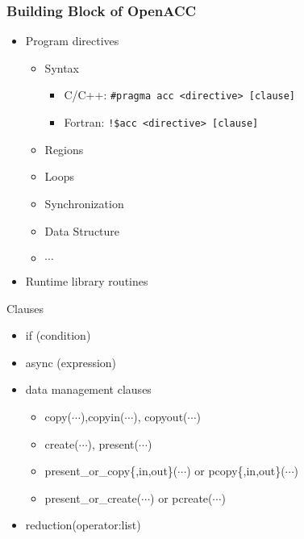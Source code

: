 \documentclass[c,mathserif,compress,xcolor=svgnames]{beamer}
\newenvironment{eblock}[0]
{
\begin{beamerboxesrounded}[upper=uppercol2,lower=lowercol2,shadow=true]}
{\end{beamerboxesrounded}}
\begin{document}
\begin{frame}
  \frametitle{\small Building Block of OpenACC}
  \begin{eblock}{}
    \begin{itemize}
      \item Program directives
        \begin{itemize}
          \item Syntax
            \begin{itemize}
              \item C/C++: \texttt{\#pragma acc <directive> [clause]}
              \item Fortran: \texttt{!\$acc <directive> [clause]}
            \end{itemize}
          \item Regions
          \item Loops
          \item Synchronization
          \item Data Structure
          \item $\cdots$
        \end{itemize}
      \item Runtime library routines
    \end{itemize}
  \end{eblock}
\end{frame}

\begin{frame}{\small Clauses}
  \begin{itemize}
    \item if (condition)
    \item async (expression)
    \item data management clauses
    \begin{itemize}
      \item copy($\cdots$),copyin($\cdots$), copyout($\cdots$)
      \item create($\cdots$), present($\cdots$)
      \item present\_or\_copy\{,in,out\}($\cdots$) or pcopy\{,in,out\}($\cdots$)
      \item present\_or\_create($\cdots$) or pcreate($\cdots$)
    \end{itemize}
    \item reduction(operator:list)
  \end{itemize}
\end{frame}
\end{document}
